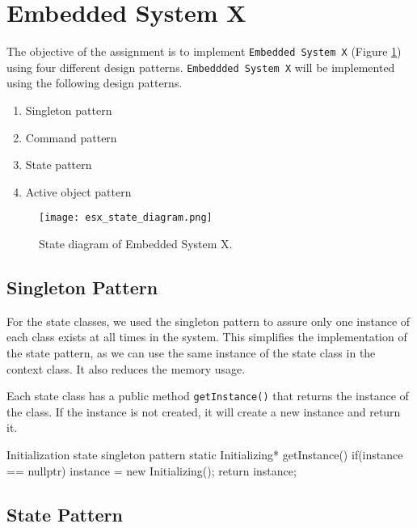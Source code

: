 \documentclass[../main.tex]{subfiles}
\begin{document}
\section{Embedded System X}

The objective of the assignment is to implement \texttt{Embedded System X} (Figure \ref{fig:esx_state_diagram}) using four different design patterns. \texttt{Embeddded System X} will be implemented using the following design patterns.

\begin{enumerate}
    \item Singleton pattern
    \item Command pattern
    \item State pattern
    \item Active object pattern
\end{enumerate}

\begin{figure}[h]
    \centering
    \texttt{[image: esx\_state\_diagram.png]}
    \caption{State diagram of Embedded System X.}
    \label{fig:esx_state_diagram}
\end{figure}

\subsection{Singleton Pattern}

For the state classes, we used the singleton pattern to assure only one instance of each class exists at all times in the system. This simplifies the implementation of the state pattern, as we can use the same instance of the state class in the context class. It also reduces the memory usage. 

\vspace{10pt}
Each state class has a public method \texttt{getInstance()} that returns the instance of the class. If the instance is not created, it will create a new instance and return it.

\begin{myminted}{Initialization state singleton pattern}
static Initializing* getInstance() {
    if(instance == nullptr) {
        instance = new Initializing();
    }
    return instance;
}
\end{myminted}

\newpage

\subsection{State Pattern}
\end{document}
